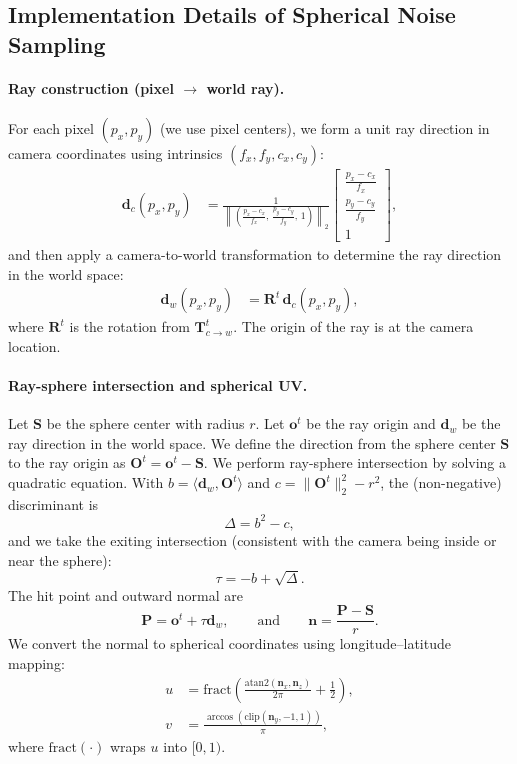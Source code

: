 \subsection{Implementation Details of Spherical Noise Sampling}
\label{sec:move_the_world_imple}
\paragraph{Ray construction (pixel $\rightarrow$ world ray).}
For each pixel $(p_x,p_y)$ (we use pixel centers), we form a unit ray direction in camera coordinates using intrinsics $(f_x,f_y,c_x,c_y)$:
\begin{align}
\mathbf{d}_{c}(p_x,p_y) 
&= 
\frac{1}{\left\| \left(\frac{p_x-c_x}{f_x},\,\frac{p_y-c_y}{f_y},\,1\right) \right\|_2}
\begin{bmatrix}
\frac{p_x-c_x}{f_x}\\[2pt]
\frac{p_y-c_y}{f_y}\\[2pt]
1
\end{bmatrix},
\end{align}
and then apply a camera-to-world transformation to determine the ray direction in the world space:
\begin{align}
\mathbf{d}_{w}(p_x,p_y) 
&= \mathbf{R}^t \, \mathbf{d}_{c}(p_x,p_y),
\end{align}
where $\mathbf{R}^t$ is the rotation from $\mathbf{T}_{c\rightarrow w}^t$.
The origin of the ray is at the camera location. 

\paragraph{Ray-sphere intersection and spherical UV.}
Let $\mathbf{S}$ be the sphere center with radius $r$. 
Let $\mathbf{o}^t$ be the ray origin and $\mathbf{d}_w$ be the ray direction in the world space. We define the direction from the sphere center $\mathbf{S}$ to the ray origin as $\mathbf{O}^t=\mathbf{o}^t-\mathbf{S}$.
We perform ray-sphere intersection by solving a quadratic equation.
With $b=\langle \mathbf{d}_w,\mathbf{O}^t\rangle$ and $c=\|\mathbf{O}^t\|_2^2-r^2$, the (non-negative) discriminant is
\begin{equation}
\Delta = b^2 - c,
\end{equation}
and we take the exiting intersection (consistent with the camera being inside or near the sphere):
\begin{equation}
\tau = -b + \sqrt{\Delta} .
\end{equation}
The hit point and outward normal are
\begin{equation}
\mathbf{P} = \mathbf{o}^t + \tau \mathbf{d}_w,
\qquad \mathrm{and} \qquad
\mathbf{n} = \frac{\mathbf{P}-\mathbf{S}}{r}.
\end{equation}
We convert the normal to spherical coordinates using longitude--latitude mapping:
\begin{align}
u &= \mathrm{fract}\!\left(\frac{\mathrm{atan2}(\mathbf{n}_x, \mathbf{n}_z)}{2\pi} + \frac{1}{2}\right),
\\
v &= \frac{\arccos(\mathrm{clip}(\mathbf{n}_y,-1,1))}{\pi},
\end{align}
where $\mathrm{fract}(\cdot)$ wraps $u$ into $[0,1)$.

